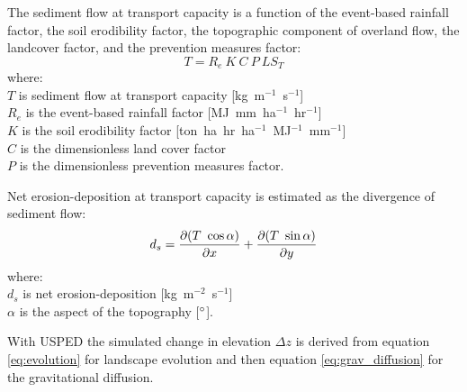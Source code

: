\documentclass[gmd, manuscript]{copernicus}
\begin{document}
\noindent
The sediment flow at transport capacity is a function of 
the event-based rainfall factor, the soil erodibility factor, 
the topographic component of overland flow,
the landcover factor, and the prevention measures factor:
%
\begin{equation}
\label{eq:usped}
{T = R_e ~ K ~ C ~ P ~ LS_T}
\end{equation}
{\small
\noindent
where: \\
\noindent
\hspace*{0.5em} $T$ is sediment flow at transport capacity [\unit{kg~m}$^{-1}$~\unit{s}$^{-1}$]\\ 
\hspace*{0.5em} $R_e$ is the event-based rainfall factor [\unit{MJ~mm~ha}$^{-1}$~\unit{hr}$^{-1}$]\\
\hspace*{0.5em} $K$ is the soil erodibility factor [\unit{ton~ha~hr~ha}$^{-1}$~\unit{MJ}$^{-1}$~\unit{mm}$^{-1}$]\\ 
\hspace*{0.5em} $C$ is the dimensionless land cover factor\\
\hspace*{0.5em} $P$ is the dimensionless prevention measures factor.\\
}

\noindent
Net erosion-deposition at transport capacity is estimated as the divergence of sediment flow: 
\begin{equation}\label{eq:usped_erdep} 
d_s = 
{\partial (T ~ \cos \alpha) \over \partial x} +
{\partial (T ~ \sin \alpha) \over \partial y}
\end{equation}
{\small
\noindent
where: \\
\hspace*{0.5em} $d_s$ is net erosion-deposition [\unit{kg~m}$^{-2}$~\unit{s}$^{-1}$]\\
\hspace*{0.5em} $\alpha$ is the aspect of the topography [$^{\circ}$].\\
}


\noindent
With USPED the simulated change in elevation $\Delta z$
is derived from equation \ref{eq:evolution} for landscape evolution
and then equation \ref{eq:grav_diffusion}
for the gravitational diffusion.

\end{document}

